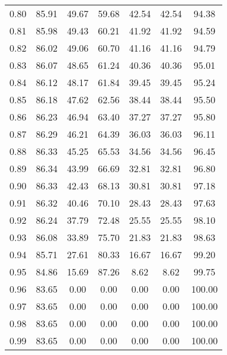 \begin{tabular}{|c|c|c|c|c|c|c|}
      0.80 &     85.91 &     49.67 &      59.68 &   42.54 &      42.54 &         94.38 \\
      0.81 &     85.98 &     49.43 &      60.21 &   41.92 &      41.92 &         94.59 \\
      0.82 &     86.02 &     49.06 &      60.70 &   41.16 &      41.16 &         94.79 \\
      0.83 &     86.07 &     48.65 &      61.24 &   40.36 &      40.36 &         95.01 \\
      0.84 &     86.12 &     48.17 &      61.84 &   39.45 &      39.45 &         95.24 \\
      0.85 &     86.18 &     47.62 &      62.56 &   38.44 &      38.44 &         95.50 \\
      0.86 &     86.23 &     46.94 &      63.40 &   37.27 &      37.27 &         95.80 \\
      0.87 &     86.29 &     46.21 &      64.39 &   36.03 &      36.03 &         96.11 \\
      0.88 &     86.33 &     45.25 &      65.53 &   34.56 &      34.56 &         96.45 \\
      0.89 &     86.34 &     43.99 &      66.69 &   32.81 &      32.81 &         96.80 \\
      0.90 &     86.33 &     42.43 &      68.13 &   30.81 &      30.81 &         97.18 \\
      0.91 &     86.32 &     40.46 &      70.10 &   28.43 &      28.43 &         97.63 \\
      0.92 &     86.24 &     37.79 &      72.48 &   25.55 &      25.55 &         98.10 \\
      0.93 &     86.08 &     33.89 &      75.70 &   21.83 &      21.83 &         98.63 \\
      0.94 &     85.71 &     27.61 &      80.33 &   16.67 &      16.67 &         99.20 \\
      0.95 &     84.86 &     15.69 &      87.26 &    8.62 &       8.62 &         99.75 \\
      0.96 &     83.65 &      0.00 &       0.00 &    0.00 &       0.00 &        100.00 \\
      0.97 &     83.65 &      0.00 &       0.00 &    0.00 &       0.00 &        100.00 \\
      0.98 &     83.65 &      0.00 &       0.00 &    0.00 &       0.00 &        100.00 \\
      0.99 &     83.65 &      0.00 &       0.00 &    0.00 &       0.00 &        100.00 \\
\bottomrule
\end{tabular}
